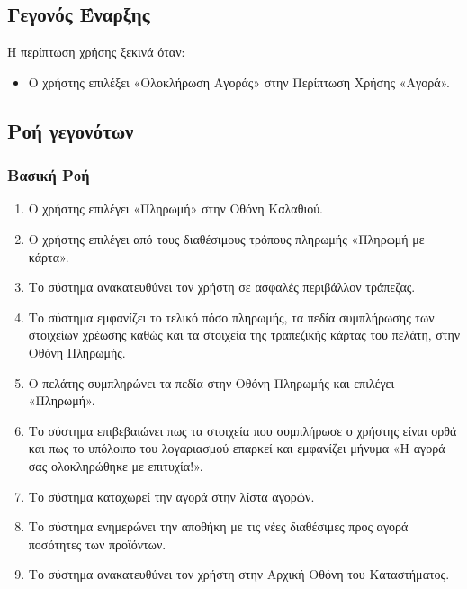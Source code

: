 \documentclass[12pt,a4paper,twoside]{book}
\begin{document}
\subsection{Γεγονός Έναρξης}
Η περίπτωση χρήσης ξεκινά όταν:
\begin{itemize}
  \item Ο χρήστης επιλέξει «Ολοκλήρωση Αγοράς» στην Περίπτωση Χρήσης «Αγορά». %
\end{itemize}

\subsection{Ροή γεγονότων}

\subsubsection{Βασική Ροή}
\begin{enumerate}
  \item Ο χρήστης επιλέγει «Πληρωμή» στην Οθόνη Καλαθιού. %
  \item Ο χρήστης επιλέγει από τους διαθέσιμους τρόπους πληρωμής «Πληρωμή με κάρτα». %
  \item Το σύστημα ανακατευθύνει τον χρήστη σε ασφαλές περιβάλλον τράπεζας.  %
  \item Το σύστημα εμφανίζει το τελικό πόσο πληρωμής, τα πεδία συμπλήρωσης των στοιχείων χρέωσης καθώς και τα στοιχεία της τραπεζικής κάρτας του πελάτη, στην Οθόνη Πληρωμής. %
  \item Ο πελάτης συμπληρώνει τα πεδία στην Οθόνη Πληρωμής και επιλέγει «Πληρωμή». %
  \item Το σύστημα επιβεβαιώνει πως τα στοιχεία που συμπλήρωσε ο χρήστης είναι ορθά και πως το υπόλοιπο του λογαριασμού επαρκεί και εμφανίζει μήνυμα «Η αγορά σας ολοκληρώθηκε με επιτυχία!». %
  \item Το σύστημα καταχωρεί την αγορά στην λίστα αγορών. %
  \item Το σύστημα ενημερώνει την αποθήκη με τις νέες διαθέσιμες προς αγορά ποσότητες των προϊόντων. %
  \item Το σύστημα ανακατευθύνει τον χρήστη στην Αρχική Οθόνη του Καταστήματος. %
\end{enumerate}
\end{document}
